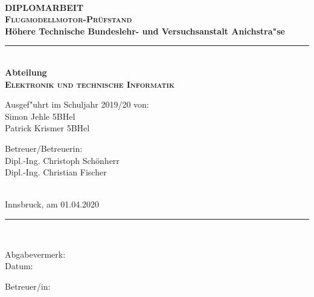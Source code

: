 \documentclass[12pt,a4paper]{article}
\begin{document}
\addtocounter{page}{0}
%
%
 \begin{center}
   \begin{minipage}{\linewidth}
   \begin{center}
	\vspace*{-14mm}
	\noindent%
	\\[35mm]{\fontsize{25pt}{25pt}\selectfont\bf DIPLOMARBEIT}
	\\[19mm]{\fontsize{20pt}{20pt}\selectfont\textbf{\textsc{Flugmodellmotor-Prüfstand}}}
	\\[15mm]{\fontsize{12.4pt}{12.4pt}\selectfont\bf
		Höhere Technische Bundeslehr- und Versuchsanstalt Anichstra"se}
	\\[ 5mm]\rule{132mm}{1.0pt}
	\\[ 4mm]{\fontsize{12.4pt}{12.4pt}\selectfont\bf Abteilung}
	\\[ 5mm]{\fontsize{16pt}{16pt}\selectfont
		\textbf{\textsc{Elektronik und technische Informatik}}}
	\\[24mm]{\hspace*{2mm}\parbox{154mm}{\fontsize{12.4pt}{12.4pt}\selectfont
	  \parbox[t]{75mm}{
		Ausgef"uhrt im Schuljahr 2019/20 von:
		\\[5.0mm]Simon Jehle 5BHel
		\\[2.5mm]Patrick Krismer 5BHel
	  }
	  \hspace*{6mm}
	  \parbox[t]{55mm}{
		Betreuer/Betreuerin:
		\\[5.0mm]Dipl.-Ing. Christoph Schönherr
		\\[5.0mm]Dipl.-Ing. Christian Fischer
		
	  }
	  \\[14mm]{Innsbruck, am 01.04.2020}
	  \\[16mm]\rule{150mm}{0.5pt}
	  \\[ 8mm]
	  \parbox[t]{75mm}{
		Abgabevermerk:
		\\[3.25mm]Datum:
	  }
	  \hspace*{6mm}
	  \parbox[t]{50mm}{
		Betreuer/in:
	  }
	}}
   \end{center}\hfill
   \end{minipage}
 \end{center}
%
\newpage
\end{document}
